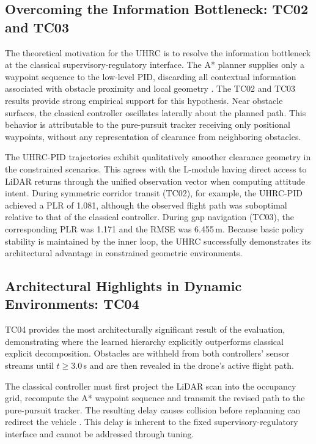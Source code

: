 \documentclass[12pt, a4paper]{article}
\begin{document}
\subsection{Overcoming the Information Bottleneck: TC02 and TC03}
\label{sec:discuss_bottleneck}

The theoretical motivation for the UHRC is to resolve the information bottleneck at the classical supervisory-regulatory interface.
The A* planner supplies only a waypoint sequence to the low-level PID, discarding all contextual information associated with obstacle proximity and local geometry \parencite{kolchinsky_nonlinear_2019, abdelmaksoud_control_2020}.
The TC02 and TC03 results provide strong empirical support for this hypothesis.
Near obstacle surfaces, the classical controller oscillates laterally about the planned path.
This behavior is attributable to the pure-pursuit tracker receiving only positional waypoints, without any representation of clearance from neighboring obstacles.

The UHRC-PID trajectories exhibit qualitatively smoother clearance geometry in the constrained scenarios.
This agrees with the L-module having direct access to LiDAR returns through the unified observation vector when computing attitude intent.
During symmetric corridor transit (TC02), for example, the UHRC-PID achieved a PLR of 1.081, although the observed flight path was suboptimal relative to that of the classical controller.
During gap navigation (TC03), the corresponding PLR was 1.171 and the RMSE was 6.455\,m.
Because basic policy stability is maintained by the inner loop, the UHRC successfully demonstrates its architectural advantage in constrained geometric environments.

\subsection{Architectural Highlights in Dynamic Environments: TC04}
\label{sec:discuss_tc04}

TC04 provides the most architecturally significant result of the evaluation, demonstrating where the learned hierarchy explicitly outperforms classical explicit decomposition.
Obstacles are withheld from both controllers' sensor streams until $t \geq 3.0$\,s and are then revealed in the drone's active flight path.

The classical controller must first project the LiDAR scan into the occupancy grid, recompute the A* waypoint sequence and transmit the revised path to the pure-pursuit tracker.
The resulting delay causes collision before replanning can redirect the vehicle \parencite{li_hierarchical_2023, zhu_hierarchical_2024}.
This delay is inherent to the fixed supervisory-regulatory interface and cannot be addressed through tuning.
\end{document}
